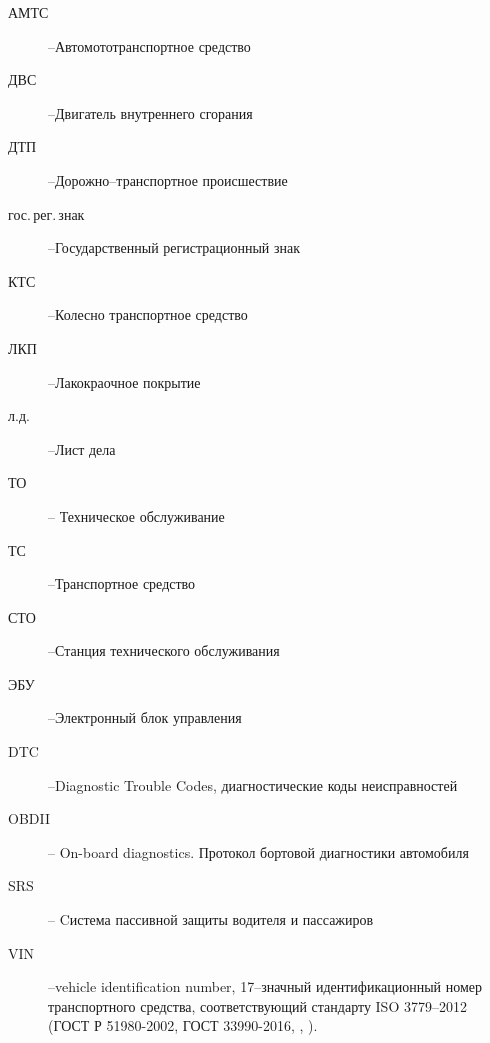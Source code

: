 \begin{description}
	\item[АМТС] --Автомототранспортное средство
	\item[ДВС] --Двигатель внутреннего сгорания
	\item[ДТП] --Дорожно--транспортное происшествие
	\item[гос.\,рег.\,знак] --Государственный регистрационный знак
	\item[КТС] --Колесно транспортное средство 
	\item[ЛКП] --Лакокраочное покрытие
	\item[л.д.] --Лист дела
	\item[ТО] -- Техническое обслуживание
	\item[ТС] --Транспортное средство
	\item[СТО] --Станция технического обслуживания
	\item[ЭБУ] --Электронный блок управления
	\item[DTC] --Diagnostic Trouble Codes, диагностические коды неисправностей
	\item[OBDII] -- On-board diagnostics. Протокол бортовой диагностики автомобиля
	\item[SRS] -- Cистема пассивной защиты водителя и пассажиров
	\item[VIN] --vehicle identification number, 17--значный идентификационный номер транспортного средства, соответствующий стандарту ISO 3779--2012 (ГОСТ Р 51980-2002, ГОСТ 33990-2016, \cite{51980:gost}, \cite{33990:gost}).
\end{description}
